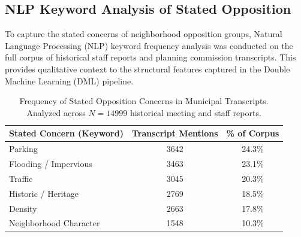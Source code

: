 \subsection{NLP Keyword Analysis of Stated Opposition}
\noindent To capture the stated concerns of neighborhood opposition groups, Natural Language Processing (NLP) keyword frequency analysis was conducted on the full corpus of historical staff reports and planning commission transcripts. This provides qualitative context to the structural features captured in the Double Machine Learning (DML) pipeline.

\begin{table}[h!]
\centering
\begin{tabular}{l c c}
\toprule
\textbf{Stated Concern (Keyword)} & \textbf{Transcript Mentions} & \textbf{\% of Corpus} \\
\midrule
Parking & 3642 & 24.3\% \\
Flooding / Impervious & 3463 & 23.1\% \\
Traffic & 3045 & 20.3\% \\
Historic / Heritage & 2769 & 18.5\% \\
Density & 2663 & 17.8\% \\
Neighborhood Character & 1548 & 10.3\% \\
\bottomrule
\end{tabular}
\caption[Frequency of Stated Opposition Concerns in Municipal Transcripts]{Frequency of Stated Opposition Concerns in Municipal Transcripts. Analyzed across $N=14999$ historical meeting and staff reports.}
\label{tbl:nlp_keywords}
\end{table}
